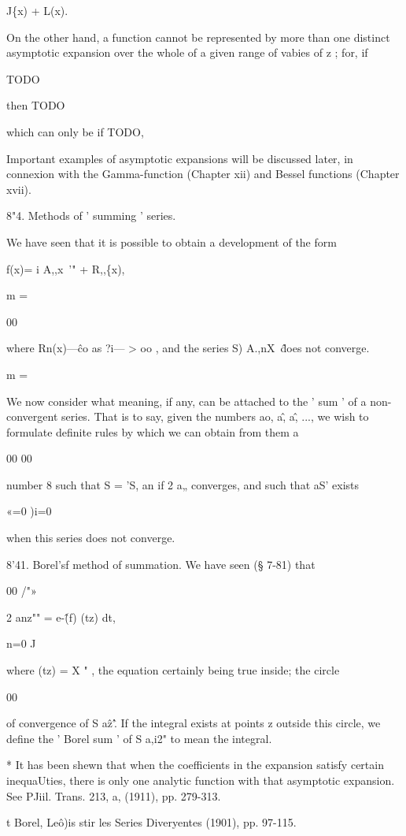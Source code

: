 J\{x) + L(x). 

On the other hand, a function cannot be represented by more than one distinct 
asymptotic expansion over the whole of a given range of vabies of z ; for, if 

TODO

then TODO

which can only be if TODO,

Important examples of asymptotic expansions will be discussed later, in connexion 
with the Gamma-function (Chapter xii) and Bessel functions (Chapter xvii). 

8"4. Methods of ' summing ' series. 

We have seen that it is possible to obtain a development of the form 

f(x)= i A,,x~'" + R,,\{x), 

m = 

00 

where Rn(x)—\^ co as ?i— > oo , and the series S) A.,nX~\^ does not converge. 

m = 

We now consider what meaning, if any, can be attached to the ' sum ' of 
a non- convergent series. That is to say, given the numbers ao, a\^, a\^, ..., 
we wish to formulate definite rules by which we can obtain from them a 

00 00 

number 8 such that S = 'S, an if 2 a„ converges, and such that aS' exists 

«=0 )i=0 

when this series does not converge. 

8'41. Borel'sf method of summation. 
We have seen (§ 7-81) that 

00 /"» 

2 anz"" = e-\^(f) (tz) dt, 

n=0 J 

where (tz) = X " , the equation certainly being true inside; the circle 

00 

of convergence of S a\^z'\^. If the integral exists at points z outside this 
circle, we define the ' Borel sum ' of S a,i2" to mean the integral. 

* It has been shewn that when the coefficients in the expansion satisfy certain inequaUties, 
there is only one analytic function with that asymptotic expansion. See PJiil. Trans. 213, a, 
(1911), pp. 279-313. 

t Borel, Le\^o)is stir les Series Diveryentes (1901), pp. 97-115. 



